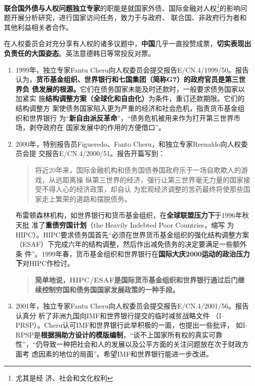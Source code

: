 \textbf{联合国外债与人权问题独立专家}的职能是就国家外债、国际金融对人权\footnote{尤其是经
  济、社会和文化权利}的影响问题开展分析研究，进行国家访问任务，致力于与政府、
联合国、非政府行为者和其他利益相关者合作。

在人权委员会对充分享有人权的诸多议题中，\textbf{中国}几乎一直投赞成票，\textbf{切实表现出
  负责任的大国姿态}。英法意德韩日等常投反对票。

\begin{enumerate}
\item 1999年，独立专家Fantu Cheru向人权委员会提交报告E/CN.4/1999/50。报告
  认为，\textbf{货币基金组织、世界银行和七国集团（简称G7）的政府官员是第三世界负
    债发展的根源。}它们在债务国家未能及时还款时，一般要求债务国家以加紧实
  施\textbf{结构调整方案（全球化和自由化）}为条件，重订还款期限。它们的结构调整方
  案使债务国家陷入更为严重的经济和社会危机，指责货币基金组织和世界银行
  为“\textbf{新自由派反革命}”，“债务危机被用来作为打开第三世界市场，剥夺政府在
  国家发展中的作用的方便借口”。

\item 2000年，特别报告员Figueredo、Fanto Cheru，和独立专家Reenaldo向人权委员会提
  交报告E/CN.4/2000/51。报告开篇写到：
  \begin{quotation}
    将近20年来，国际金融机构和债务国债券国政府乐于一场自欺欺人的游戏，从远距离操
    纵第三世界的经济，强行让第三世界毫无力量的国家接受不得人心的经济政策，却自认
    为宏观经济调整的苦药最终将使那些国家走上繁荣的道路和摆脱债务。
  \end{quotation}

  布雷顿森林机构，如世界银行和货币基金组织，在\textbf{全球联盟压力下}于1996年秋天批
  准了\textbf{重债穷国计划}（the Heavily Indebted Poor Countries，缩写
  为HIPC）。HIPC要求债务国首先“必须在世界货币基金组织的强化结构调整方案
  （ESAF）下完成六年的结构调整，然后作出减免债务的决定要满足一些额外条
  件”。1999年春，货币基金组织和世界银行在\textbf{国际大庆2000运动的政治压力
    下}对HIPC作检讨。
  \begin{quotation}
    \textbf{简单地说，HIPC/ESAF是国际货币基金组织和世界银行通过后门继续控制穷国和债务国国家发展政策的一种手段。}
  \end{quotation}

\item 2001年，独立专家Fantu Cheru向人权委员会提交报告E/CN.4/2001/56。报告认真分
  析了非洲九国向IMF和世界银行提交的临时减贫战略文件
  （I--PRSP）。Cheru认可IMF和世界银行此举积极的一面，也提出一些批评，
  如I-RPSP是\textbf{根据捐助方设计的模版编制}，“谈不上国家所有权的真实可靠
  性”，“仍导致一种把社会和人的发展以及公平方面的关注问题放在次于财政方面考
  虑因素的地位的局面”。希望IMF和世界银行能进一步改进。


\end{enumerate}
